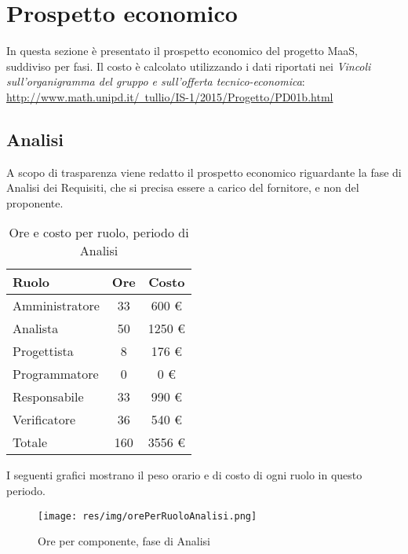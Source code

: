 \section{Prospetto economico}
In questa sezione è presentato il prospetto economico del progetto MaaS, suddiviso per fasi. Il costo è calcolato utilizzando i dati
riportati nei \textit{Vincoli sull’organigramma del gruppo e sull’offerta tecnico-economica}:
\href{http://www.math.unipd.it/~tullio/IS-1/2015/Progetto/PD01b.html}{http://www.math.unipd.it/~tullio/IS-1/2015/Progetto/PD01b.html}


\subsection{Analisi}
A scopo di trasparenza viene redatto il prospetto economico riguardante la fase di Analisi dei Requisiti, che si precisa essere a carico del fornitore, e non del proponente.

\begin{table}[H]
	\centering
	\begin{tabular}{ l c c }
		\textbf{Ruolo} & \textbf{Ore} & \textbf{Costo} \\
		\hline
		Amministratore & 33 & 600 \euro \\
		Analista & 50 & 1250 \euro \\
		Progettista & 8 & 176 \euro \\
		Programmatore & 0 & 0 \euro \\
		Responsabile & 33 & 990 \euro \\
		Verificatore & 36 & 540 \euro \\
		\hline
		Totale & 160 & 3556 \euro \\
		\hline
	\end{tabular}
	\caption{Ore e costo per ruolo, periodo di Analisi}
\end{table}

I seguenti grafici mostrano il peso orario e di costo di ogni ruolo in questo periodo.

\begin{figure}[H]
  \begin{center}
    \texttt{[image: res/img/orePerRuoloAnalisi.png]}
  \caption{Ore per componente, fase di Analisi}
  \end{center} 
\end{figure}  

